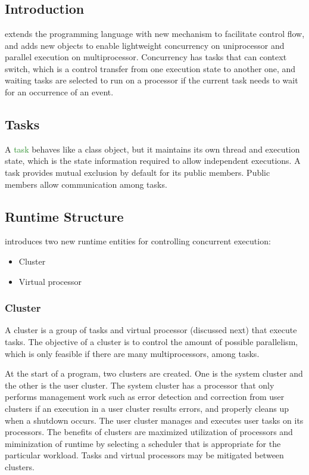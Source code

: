 \chapter{\uCPP} \label{uCPP}

\section{Introduction}
\CCS \cite{reference10} extends the \CCS programming language with new mechanism to
facilitate control flow, and adds new objects to enable lightweight concurrency
on uniprocessor and parallel execution on multiprocessor. Concurrency has tasks
that can context switch, which is a control transfer from one execution state to
another one, and waiting tasks are selected to run on a processor if the current
task needs to wait for an occurrence of an event.

\section{Tasks}
A \textcolor{ForestGreen}{task} behaves like a class object, but it maintains its own
thread and execution state, which is the state information required to allow
independent executions. A task provides mutual exclusion by default for its
public members. Public members allow communication among tasks.

\section{\uCPPS Runtime Structure}
\uCPPS introduces two new runtime entities for controlling concurrent execution:
\begin{itemize}
    \item Cluster
    \item Virtual processor
\end{itemize}

\subsection{Cluster}
A cluster is a group of tasks and virtual processor (discussed next) that
execute tasks. The objective of a cluster is to control the amount of possible
parallelism, which is only feasible if there are many multiprocessors, among tasks.

At the start of a \uCPPS program, two clusters are created. One is the system
cluster and the other is the user cluster. The system cluster has a
processor that only performs management work such as error detection and
correction from user clusters if an execution in a user cluster results errors,
and properly cleans up when a shutdown occurs. The user cluster manages and
executes user tasks on its processors. The benefits of clusters
are maximized utilization of processors and miminization of runtime by selecting
a scheduler that is appropriate for the particular workload. Tasks and virtual
processors may be mitigated between clusters.

